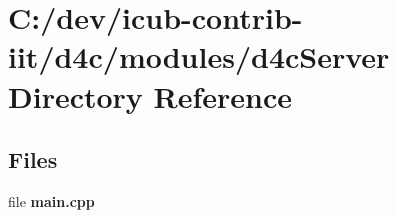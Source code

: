 \section{C\+:/dev/icub-\/contrib-\/iit/d4c/modules/d4c\+Server Directory Reference}
\label{dir_6da782a0f1d54235d451d380222fd43d}
\subsection*{Files}
\begin{DoxyCompactItemize}
\item 
file {\bfseries main.\+cpp}
\end{DoxyCompactItemize}

